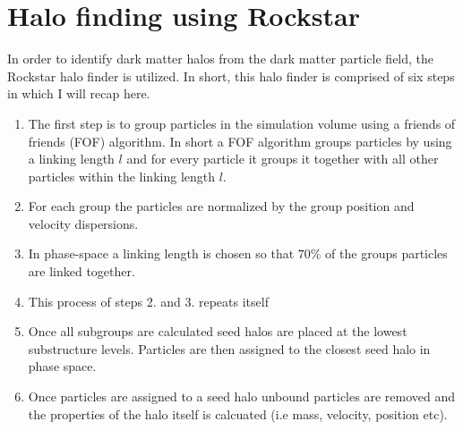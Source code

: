 \section{Halo finding using Rockstar}
In order to identify dark matter halos from the dark matter particle field, the Rockstar halo finder\cite{rockstar} is utilized. In short, this halo finder is comprised of six steps in which I will recap here.
\begin{enumerate}
    \item The first step is to group particles in the simulation volume using a friends of friends (FOF) algorithm. In short a FOF algorithm groups particles by using a linking length $l$ and for every particle it groups it together with all other particles within the linking length $l$.
    \item For each group the particles are normalized by the group position and velocity dispersions.
    \item In phase-space a linking length is chosen so that $70$\% of the groups particles are linked together.
    \item This process of steps 2. and 3. repeats itself
    \item Once all subgroups are calculated seed halos are placed at the lowest substructure levels. Particles are then assigned to the closest seed halo in phase space.
    \item Once particles are assigned to a seed halo unbound particles are removed and the properties of the halo itself is calcuated (i.e mass, velocity, position etc).
\end{enumerate}
